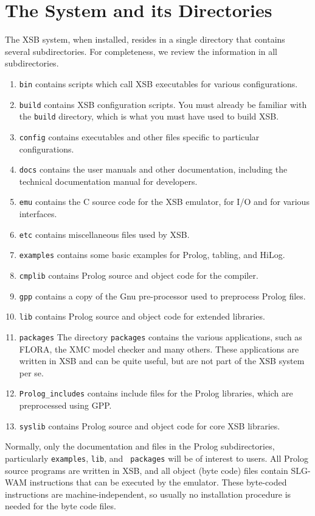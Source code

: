 \section{The System and its Directories}
The XSB system, when installed, resides in a single directory that
contains several subdirectories.  For completeness, we review the
information in all subdirectories.
\begin{enumerate}
\item {\tt bin} contains scripts which call XSB executables
for various configurations.
%
\item {\tt build} contains XSB configuration scripts.  You must
already be familiar with the {\tt build} directory, which is what you
must have used to build XSB.
%
\item {\tt config} contains executables and other files specific to
particular configurations.
%
\item {\tt docs} contains the user manuals and other documentation,
including the technical documentation manual for developers.
%
\item {\tt emu} contains the C source code for the XSB emulator, for
I/O and for various interfaces.
%
\item {\tt etc} contains miscellaneous files used by XSB.
%
\item {\tt examples} contains some basic examples for Prolog, tabling,
and HiLog.
%
\item {\tt cmplib} contains Prolog source and object code for the
compiler. 
%
\item {\tt gpp} contains a copy of the Gnu pre-processor used to
preprocess Prolog files.
%
\item {\tt lib} contains Prolog source and object code for extended
libraries. 
%
\item {\tt packages} The directory {\tt packages} contains the various
applications, such as FLORA, the XMC model checker and many others.
These applications are written in XSB and can be quite useful, but are
not part of the XSB system per se.
%
\item {\tt Prolog\_includes} contains include files for the Prolog
libraries, which are preprocessed using GPP.
%
\item {\tt syslib} contains Prolog source and object code for core XSB
libraries. 
\end{enumerate}

Normally, only the documentation and files in the Prolog
subdirectories, particularly {\tt examples}, {\tt lib}, and {\tt
packages} will be of interest to users.  All Prolog source programs
are written in XSB, and all object (byte code) files contain SLG-WAM
instructions that can be executed by the emulator.  These byte-coded
instructions are machine-independent, so usually no installation
procedure is needed for the byte code files.

